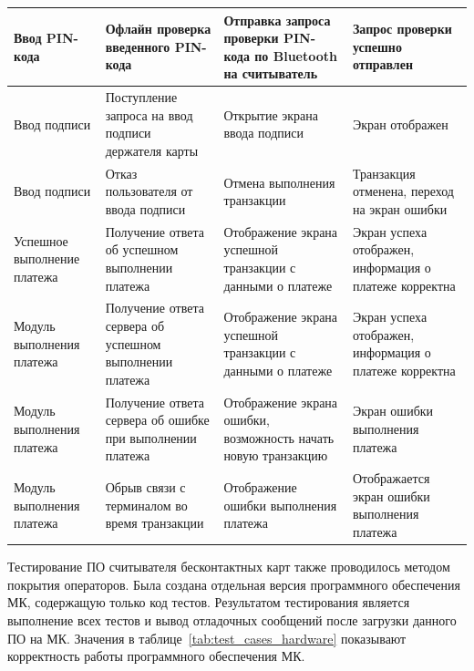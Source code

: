 \begin{longtable}[l]{| P{0.18\textwidth} | P{0.2\textwidth} | P{0.26\textwidth} | P{0.26\textwidth}|}
    Ввод PIN-кода &
    Офлайн проверка введенного PIN-кода &
    Отправка запроса проверки PIN-кода по Bluetooth на считыватель &
    Запрос проверки успешно отправлен \\
    \hline

    Ввод подписи &
    Поступление запроса на ввод подписи держателя карты &
    Открытие экрана ввода подписи &
    Экран отображен \\
    \hline

    Ввод подписи &
    Отказ пользователя от ввода подписи &
    Отмена выполнения транзакции &
    Транзакция отменена, переход на экран ошибки \\
    \hline

    Успешное выполнение платежа &
    Получение ответа об успешном выполнении платежа &
    Отображение экрана успешной транзакции с данными о платеже &
    Экран успеха отображен, информация о платеже корректна \\
    \hline

    Модуль выполнения платежа &
    Получение ответа сервера об успешном выполнении платежа &
    Отображение экрана успешной транзакции с данными о платеже &
    Экран успеха отображен, информация о платеже корректна \\
    \hline

    Модуль выполнения платежа &
    Получение ответа сервера об ошибке при выполнении платежа &
    Отображение экрана ошибки, возможность начать новую транзакцию &
    Экран ошибки выполнения платежа \\
    \hline

    Модуль выполнения платежа &
    Обрыв связи с терминалом во время транзакции &
    Отображение ошибки выполнения платежа &
    Отображается экран ошибки выполнения платежа \\
    \hline
\end{longtable}


Тестирование ПО считывателя бесконтактных карт также проводилось методом покрытия операторов.
Была создана отдельная версия программного обеспечения МК, содержащую только код тестов.
Результатом тестирования является выполнение всех тестов и вывод отладочных сообщений после загрузки данного ПО на МК.
Значения в таблице~\ref{tab:test_cases_hardware} показывают корректность работы программного обеспечения МК.

